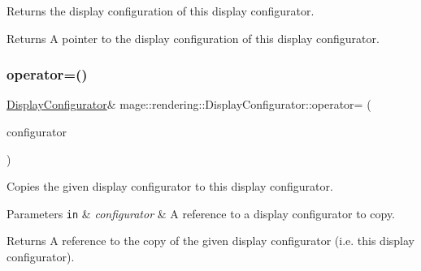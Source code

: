 Returns the display configuration of this display configurator.

\begin{DoxyReturn}{Returns}
A pointer to the display configuration of this display configurator. 
\end{DoxyReturn}
\hypertarget{classmage_1_1rendering_1_1_display_configurator_affd6a3486be8564246628a6a20518ac2}{}\label{classmage_1_1rendering_1_1_display_configurator_affd6a3486be8564246628a6a20518ac2} 
\subsubsection{\texorpdfstring{operator=()}{operator=()}\hspace{0.1cm}{\footnotesize\ttfamily [1/2]}}
{\footnotesize\ttfamily \hyperlink{classmage_1_1rendering_1_1_display_configurator}{Display\+Configurator}\& mage\+::rendering\+::\+Display\+Configurator\+::operator= (\begin{DoxyParamCaption}\item[{const \hyperlink{classmage_1_1rendering_1_1_display_configurator}{Display\+Configurator} \&}]{configurator }\end{DoxyParamCaption})\hspace{0.3cm}{\ttfamily [delete]}}

Copies the given display configurator to this display configurator.


\begin{DoxyParams}[1]{Parameters}
\mbox{\tt in}  & {\em configurator} & A reference to a display configurator to copy. \\
\hline
\end{DoxyParams}
\begin{DoxyReturn}{Returns}
A reference to the copy of the given display configurator (i.\+e. this display configurator). 
\end{DoxyReturn}
\hypertarget{classmage_1_1rendering_1_1_display_configurator_afa750c6d058e2298dd6bb9cf44d54f06}{}\label{classmage_1_1rendering_1_1_display_configurator_afa750c6d058e2298dd6bb9cf44d54f06} 
